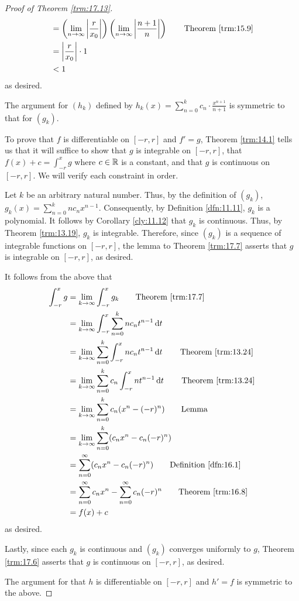 \documentclass[../main.tex]{subfiles}
\begin{document}
\begin{theorem}
\begin{proof}[Proof of Theorem \ref{trm:17.13}]
\begin{align*}
            &= \left( \lim_{n\to\infty}\left| \frac{r}{x_0} \right| \right)\left( \lim_{n\to\infty}\left| \frac{n+1}{n} \right| \right)\tag*{Theorem \ref{trm:15.9}}\\
            &= \left| \frac{r}{x_0} \right|\cdot 1\\
            &< 1
        \end{align*}
        as desired.\par\medskip
        The argument for $(h_k)$ defined by $h_k(x)=\sum_{n=0}^kc_n\cdot\frac{x^{n+1}}{n+1}$ is symmetric to that for $(g_k)$.\par\bigskip
        To prove that $f$ is differentiable on $[-r,r]$ and $f'=g$, Theorem \ref{trm:14.1} tells us that it will suffice to show that $g$ is integrable on $[-r,r]$, that $f(x)+c=\int_{-r}^xg$ where $c\in\mathbb{R}$ is a constant, and that $g$ is continuous on $[-r,r]$. We will verify each constraint in order.\par\smallskip
        Let $k$ be an arbitrary natural number. Thus, by the definition of $(g_k)$, $g_k(x)=\sum_{n=0}^knc_nx^{n-1}$. Consequently, by Definition \ref{dfn:11.11}, $g_k$ is a polynomial. It follows by Corollary \ref{cly:11.12} that $g_k$ is continuous. Thus, by Theorem \ref{trm:13.19}, $g_k$ is integrable. Therefore, since $(g_k)$ is a sequence of integrable functions on $[-r,r]$, the lemma to Theorem \ref{trm:17.7} asserts that $g$ is integrable on $[-r,r]$, as desired.\par
        It follows from the above that
        \begin{align*}
            \int_{-r}^xg &= \lim_{k\to\infty}\int_{-r}^xg_k\tag*{Theorem \ref{trm:17.7}}\\
            &= \lim_{k\to\infty}\int_{-r}^x\sum_{n=0}^knc_nt^{n-1}\dd{t}\\
            &= \lim_{k\to\infty}\sum_{n=0}^k\int_{-r}^xnc_nt^{n-1}\dd{t}\tag*{Theorem \ref{trm:13.24}}\\
            &= \lim_{k\to\infty}\sum_{n=0}^kc_n\int_{-r}^xnt^{n-1}\dd{t}\tag*{Theorem \ref{trm:13.24}}\\
            &= \lim_{k\to\infty}\sum_{n=0}^kc_n(x^n-(-r)^n)\tag*{Lemma}\\
            &= \lim_{k\to\infty}\sum_{n=0}^k(c_nx^n-c_n(-r)^n)\\
            &= \sum_{n=0}^\infty(c_nx^n-c_n(-r)^n)\tag*{Definition \ref{dfn:16.1}}\\
            &= \sum_{n=0}^\infty c_nx^n-\sum_{n=0}^\infty c_n(-r)^n\tag*{Theorem \ref{trm:16.8}}\\
            &= f(x)+c
        \end{align*}
        as desired.\par
        Lastly, since each $g_k$ is continuous and $(g_k)$ converges uniformly to $g$, Theorem \ref{trm:17.6} asserts that $g$ is continuous on $[-r,r]$, as desired.\par\medskip
        The argument for that $h$ is differentiable on $[-r,r]$ and $h'=f$ is symmetric to the above.
    \end{proof}
\end{theorem}
\end{document}
